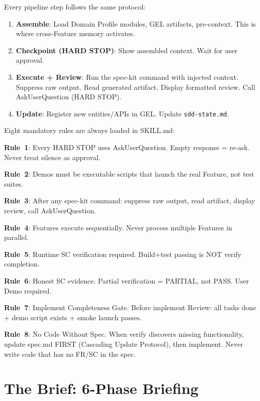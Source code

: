 \documentclass[11pt,a4paper,openright,twoside]{report}
\newcommand{\file}[1]{\texttt{#1}}
\begin{document}
Every pipeline step follows the same protocol:

\begin{enumerate}
  \item \textbf{Assemble}: Load Domain Profile modules, GEL artifacts, pre-context. This is where cross-Feature memory activates.
  \item \textbf{Checkpoint (HARD STOP)}: Show assembled context. Wait for user approval.
  \item \textbf{Execute + Review}: Run the spec-kit command with injected context. Suppress raw output. Read generated artifact. Display formatted review. Call AskUserQuestion (HARD STOP).
  \item \textbf{Update}: Register new entities/APIs in GEL. Update \file{sdd-state.md}.
\end{enumerate}

\begin{dangerbox}
Eight mandatory rules are always loaded in SKILL.md:

\textbf{Rule~1}: Every HARD STOP uses AskUserQuestion. Empty response = re-ask. Never treat silence as approval.

\textbf{Rule~2}: Demos must be executable scripts that launch the real Feature, not test suites.

\textbf{Rule~3}: After any spec-kit command: suppress raw output, read artifact, display review, call AskUserQuestion.

\textbf{Rule~4}: Features execute sequentially. Never process multiple Features in parallel.

\textbf{Rule~5}: Runtime SC verification required. Build+test passing is NOT verify completion.

\textbf{Rule~6}: Honest SC evidence. Partial verification = PARTIAL, not PASS. User Demo required.

\textbf{Rule~7}: Implement Completeness Gate. Before implement Review: all tasks done + demo script exists + smoke launch passes.

\textbf{Rule~8}: No Code Without Spec. When verify discovers missing functionality, update spec.md FIRST (Cascading Update Protocol), then implement. Never write code that has no FR/SC in the spec.
\end{dangerbox}

\section{The Brief: 6-Phase Briefing}
\end{document}
